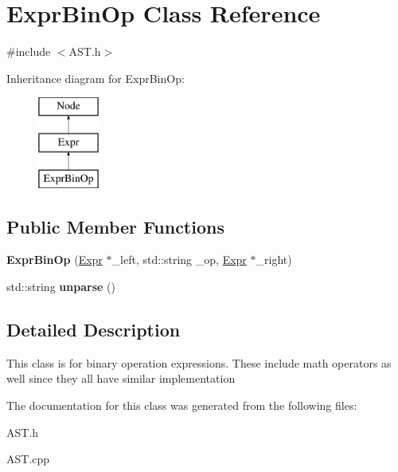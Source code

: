 \hypertarget{classExprBinOp}{\section{Expr\-Bin\-Op Class Reference}
\label{classExprBinOp}
}


{\ttfamily \#include $<$A\-S\-T.\-h$>$}

Inheritance diagram for Expr\-Bin\-Op\-:\begin{figure}[H]
\begin{center}
\leavevmode
\includegraphics[height=3.000000cm]{classExprBinOp}
\end{center}
\end{figure}
\subsection*{Public Member Functions}
\begin{DoxyCompactItemize}
\item 
\hypertarget{classExprBinOp_a732813d3afa1d4107d50cfa77e8c7f63}{{\bfseries Expr\-Bin\-Op} (\hyperlink{classExpr}{Expr} $\ast$\-\_\-left, std\-::string \-\_\-op, \hyperlink{classExpr}{Expr} $\ast$\-\_\-right)}\label{classExprBinOp_a732813d3afa1d4107d50cfa77e8c7f63}

\item 
\hypertarget{classExprBinOp_a052f921492968fd693186fb92ed28f7b}{std\-::string {\bfseries unparse} ()}\label{classExprBinOp_a052f921492968fd693186fb92ed28f7b}

\end{DoxyCompactItemize}


\subsection{Detailed Description}
This class is for binary operation expressions. These include math operators as well since they all have similar implementation 

The documentation for this class was generated from the following files\-:\begin{DoxyCompactItemize}
\item 
A\-S\-T.\-h\item 
A\-S\-T.\-cpp\end{DoxyCompactItemize}
